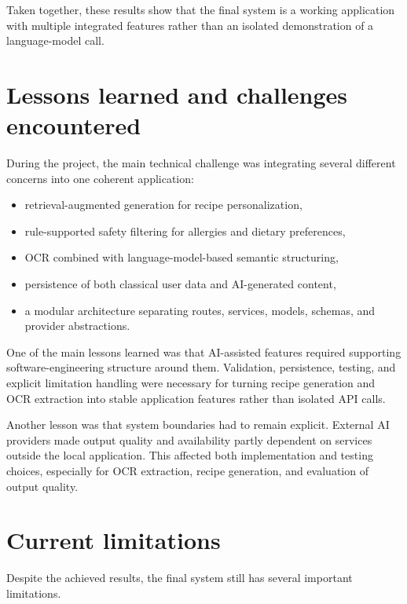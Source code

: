 Taken together, these results show that the final system is a working
application with multiple integrated features rather than an isolated
demonstration of a language-model call.

\section{Lessons learned and challenges encountered}

During the project, the main technical challenge was integrating several
different concerns into one coherent application:

\begin{itemize}
	\item retrieval-augmented generation for recipe personalization,
	\item rule-supported safety filtering for allergies and dietary
	preferences,
	\item OCR combined with language-model-based semantic structuring,
	\item persistence of both classical user data and AI-generated
	content,
	\item a modular architecture separating routes, services, models,
	schemas, and provider abstractions.
\end{itemize}

One of the main lessons learned was that AI-assisted features required
supporting software-engineering structure around them. Validation,
persistence, testing, and explicit limitation handling were necessary
for turning recipe generation and OCR extraction into stable application
features rather than isolated API calls.

Another lesson was that system boundaries had to remain explicit.
External AI providers made output quality and availability partly
dependent on services outside the local application. This affected both
implementation and testing choices, especially for OCR extraction,
recipe generation, and evaluation of output quality.

\section{Current limitations}

Despite the achieved results, the final system still has several
important limitations.

